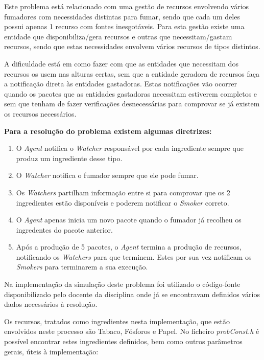 \documentclass[10pt,portuguese]{article}
\begin{document}
\par Este problema está relacionado com uma gestão de recursos envolvendo vários fumadores com necessidades distintas para fumar, sendo que cada um deles possui apenas 1 recurso com fontes inesgotáveis. Para esta gestão existe uma entidade que disponibiliza/gera recursos e outras que necessitam/gastam recursos, sendo que estas necessidades envolvem vários recursos de tipos distintos. 
\par A dificuldade está em como fazer com que as entidades que necessitam dos recursos os usem nas alturas certas, sem que a entidade geradora de recursos faça a notificação direta às entidades gastadoras. Estas notificações vão ocorrer quando os pacotes que as entidades gastadoras necessitam estiverem completos e sem que tenham de fazer verificações desnecessárias para comprovar se já existem os recursos necessários.
\par \textbf{Para a resolução do problema existem algumas diretrizes:}
\begin{enumerate}
  \item O \textit{Agent} notifica o \textit{Watcher} responsável por cada ingrediente sempre que produz um ingrediente desse tipo.
  \item O \textit{Watcher} notifica o fumador sempre que ele pode fumar.
  \item Os \textit{Watchers} partilham informação entre si para comprovar que os 2 ingredientes estão disponíveis e poderem notificar o \textit{Smoker} correto.
  \item O \textit{Agent} apenas inicia um novo pacote quando o fumador já recolheu os ingredentes do pacote anterior.
  \item Após a produção de 5 pacotes, o \textit{Agent} termina a produção de recursos, notificando os \textit{Watchers} para que terminem. Estes por sua vez notificam os \textit{Smokers} para terminarem a sua execução.
\end{enumerate}
\par Na implementação da simulação deste problema foi utilizado o código-fonte disponibilizado pelo docente da disciplina onde já se encontravam definidos vários dados necessários à resolução.

\par Os recursos, tratados como ingredientes nesta implementação, que estão envolvidos neste processo são Tabaco, Fósforos e Papel. No ficheiro \textit{probConst.h} é possível encontrar estes ingredientes definidos, bem como outros parâmetros gerais, úteis à implementação:
\end{document}
